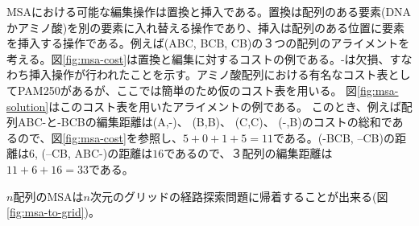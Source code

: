 \documentclass{report}
\begin{document}
MSAにおける可能な編集操作は置換と挿入である。置換は配列のある要素(DNAかアミノ酸)を別の要素に入れ替える操作であり、挿入は配列のある位置に要素を挿入する操作である。例えば(ABC, BCB, CB)の３つの配列のアライメントを考える。図\ref{fig:msa-cost}は置換と編集に対するコストの例である。-は欠損、すなわち挿入操作が行われたことを示す。アミノ酸配列における有名なコスト表としてPAM250があるが、ここでは簡単のため仮のコスト表を用いる\cite{MSA}。
図\ref{fig:msa-solution}はこのコスト表を用いたアライメントの例である。
このとき、例えば配列ABC-と-BCBの編集距離は(A,-)、 (B,B)、 (C,C)、 (-,B)のコストの総和であるので、図\ref{fig:msa-cost}を参照し、$5+0+1+5=11$である。(-BCB, --CB)の距離は$6$, (--CB, ABC-)の距離は$16$であるので、３配列の編集距離は$11+6+16=33$である。

$n$配列のMSAは$n$次元のグリッドの経路探索問題に帰着することが出来る(図\ref{fig:msa-to-grid})。


\begin{figure}
\centering
{} \hspace{4pt}
 \hspace{4pt}
\end{figure}
\end{document}

